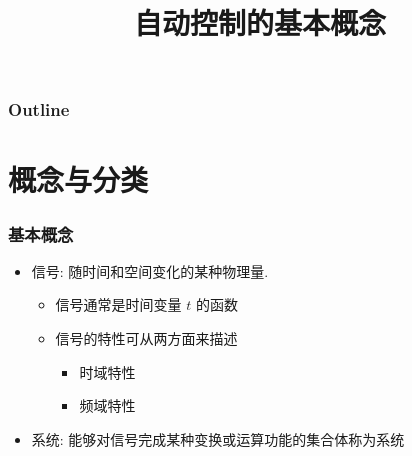 \documentclass{beamer}
\title{自动控制的基本概念}
\author{}
\date{}
\begin{document}
\maketitle

\begin{frame}
\frametitle{Outline}
\setcounter{tocdepth}{3}
\tableofcontents
\end{frame}


















\section{概念与分类}
\label{sec-1}
\begin{frame}
\frametitle{基本概念}
\label{sec-1-1}

\begin{itemize}
\item 信号: 随时间和空间变化的某种物理量.
\begin{itemize}
\item 信号通常是时间变量 $t$ 的函数
\item 信号的特性可从两方面来描述
\begin{itemize}
\item 时域特性
\item 频域特性
\end{itemize}
\end{itemize}
\item 系统: 能够对信号完成某种变换或运算功能的集合体称为系统
\end{itemize}
\end{frame}
\end{document}
